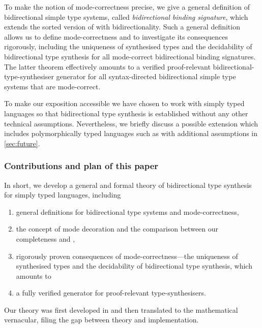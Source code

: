 To make the notion of mode-correctness precise, we give a general definition of bidirectional simple type systems, called \emph{bidirectional binding signature}, which extends the sorted version of  with bidirectionality.
Such a general definition allows us to define mode-correctness and to investigate its consequences rigorously, including the uniqueness of synthesised types and the decidability of bidirectional type synthesis for all mode-correct bidirectional binding signatures.
The latter theorem effectively amounts to a verified proof-relevant bidirectional-type-synthesiser generator for all syntax-directed bidirectional simple type systems that are mode-correct.


To make our exposition accessible we have chosen to work with simply typed languages so that bidirectional type synthesis is established without any other technical assumptions.
Nevertheless, we briefly discuss a possible extension which includes polymorphically typed languages such as \SystemF with additional assumptions in \cref{sec:future}.

\subsubsection{Contributions and plan of this paper}

%
In short, we develop a general and formal theory of bidirectional type synthesis for simply typed languages, including 
\begin{enumerate}
  \item general definitions for bidirectional type systems and mode-correctness,
  \item the concept of mode decoration and the comparison between our completeness and , 
  \item rigorously proven consequences of mode-correctness---the uniqueness of synthesised types and the decidability of bidirectional type synthesis, which amounts to
  \item a fully verified generator for proof-relevant type-synthesisers.
\end{enumerate}
Our theory was first developed in \Agda and then translated to the mathematical vernacular, filing the gap between theory and implementation.


